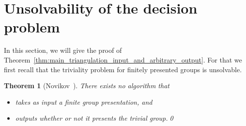 \documentclass[a4paper, reqno]{amsart}
\newtheorem{theorem}[proposition]{Theorem}
\theoremstyle{definition}
\theoremstyle{remark}
\renewcommand{\~}{\nobreak\ }
\begin{document}



\section{Unsolvability of the decision problem}
In this section, we will give the proof of Theorem\~\ref{thm:main_triangulation_input_and_arbitrary_output}. For that we first recall that the triviality problem for finitely presented groups is unsolvable.

\begin{theorem}[Novikov\~\cite{Novikov-algo-insolv}]\label{thm:triviality_problem}
    There exists no algorithm that
    \begin{itemize}
        \item takes as input a finite group presentation, and
        \item outputs whether or not it presents the trivial group.\qed
    \end{itemize}
\end{theorem}
\end{document}
